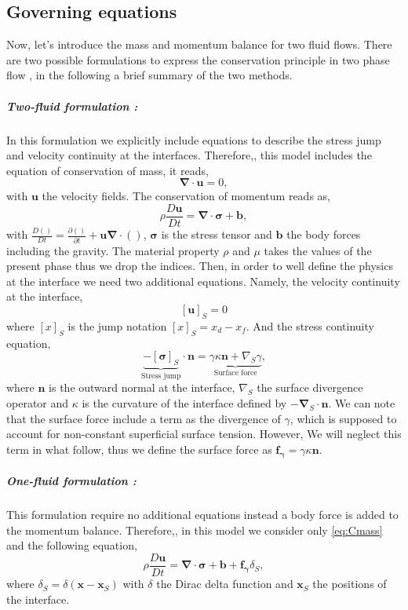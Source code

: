 \subsection{Governing equations}
Now, let's introduce the mass and momentum balance for two fluid flows. 
There are two possible formulations to express the conservation principle in two phase flow \citep{tryggvason2011direct}, in the following a brief summary of the two methods.

\subparagraph*{Two-fluid formulation :} In this formulation we explicitly include equations to describe the stress jump and velocity continuity at the interfaces.
Therefore,, this model includes the equation of conservation of mass, it reads,
\begin{equation}
    \label{eq:Cmass}
    \bm{\nabla} \cdot \bm{u}= 0,
\end{equation}  
with $\bm{u}$ the velocity fields.
The conservation of momentum reads as,
\begin{equation}
    \label{eq:Cmomentum}
    \rho \frac{D \bm{u}}{Dt} = \bm{\nabla} \cdot \bm{\sigma} + \bm{b},
\end{equation}
with $\frac{D ()}{Dt}  =  \frac{\partial ()}{\partial t}  + \bm{u} \bm{\nabla} \cdot ()$, $\bm{\sigma}$ is the stress tensor and $\bm{b}$ the body forces including the gravity. 
The material property $\rho$ and $\mu$ takes the values of the present phase thus we drop the indices.  
Then, in order to well define the physics at the interface we need two additional equations. 
Namely, the velocity continuity at the interface,
\begin{equation*}
    \left[\bm{u}\right]_S = 0
\end{equation*}
where $[x]_S$ is the jump notation $ [x]_S = x_d-x_f$.
And the stress continuity equation,
\begin{equation*}
    \underbrace{-[\bm{\sigma}]_S}_{\text{Stress jump}} \cdot \bm{n} = \underbrace{\gamma \kappa \bm{n} +\nabla_S \gamma}_{\text{Surface force}},
\end{equation*}
where $\bm{n}$ is the outward normal at the interface, $\nabla_S$ the surface divergence operator and $\kappa$ is the curvature of the interface defined by $-\bm{\nabla}_S\cdot\bm{n}$. 
We can note that the surface force include a term as the divergence of $\gamma$, which is supposed to account for non-constant superficial surface tension.
However, We will neglect this term in what follow, thus we define the surface force as $\bm{f_\gamma} = \gamma \kappa \bm{n}$.
\subparagraph*{One-fluid formulation :} This formulation require no additional equations instead a body force is added to the momentum balance. 
Therefore,, in this model we consider only \ref{eq:Cmass} and the following equation,
\begin{equation}
    \label{CmomentumOnefluide}
    \rho \frac{D \bm{u}}{Dt} = \bm{\nabla} \cdot \bm{\sigma} + \bm{b} + \bm{f_\gamma} \delta_S ,
\end{equation}
where $\delta_S = \delta(\bm{x} - \bm{x}_S)$ with $\delta$ the Dirac delta function and $\bm{x}_S$ the positions of the interface.

